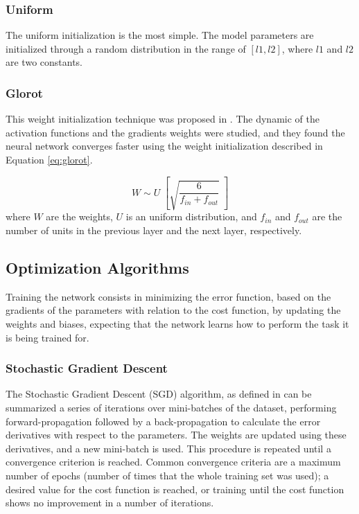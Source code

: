 \subsubsection{Uniform}
The uniform initialization is the most simple. The model parameters are initialized through a random distribution in the range of $[l1, l2]$, where $l1$ and $l2$ are two constants.

\subsubsection{Glorot}
This weight initialization technique was proposed in \cite{glorot2010understanding}. The dynamic of the activation functions and the gradients weights were studied, and they found the neural network converges faster using the weight initialization described in Equation \ref{eq:glorot}.

\begin{equation}
W \sim U \; \left[\sqrt{\frac{6}{f_{in}+f_{out}}}\; \right] 
\label{eq:glorot}
\end{equation}
where $W$ are the weights, $U$ is an uniform distribution, and $f_{in}$ and $f_{out}$ are the number of units in the previous layer and the next layer, respectively.

\subsection{Optimization Algorithms}
Training the network consists in minimizing the error function, based on the gradients of the parameters with relation to the cost function, by updating the weights and biases, expecting that the network learns how to perform the task it is being trained for.

\subsubsection{Stochastic Gradient Descent}

The Stochastic Gradient Descent (SGD) algorithm, as defined in \cite{bishop2006pattern} can be summarized a series of iterations over mini-batches of the dataset, performing forward-propagation
followed by a back-propagation to calculate the error derivatives with respect to the parameters. The weights are updated using these derivatives, and a new mini-batch is used. This procedure is repeated until a convergence criterion is  reached. Common convergence criteria are a maximum number of epochs (number of times that the whole training set was used); a desired value for the cost function is reached, or training until the cost function shows no improvement in a number of iterations.

